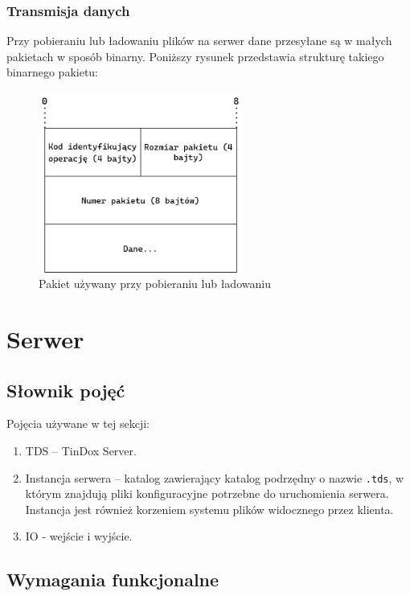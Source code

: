 \documentclass[10pt,a4paper]{article}
\begin{document}
\subsubsection{Transmisja danych}
Przy pobieraniu lub ładowaniu plików na serwer dane przesyłane są w małych pakietach w sposób binarny. Poniższy rysunek przedstawia strukturę takiego binarnego pakietu:

\begin{figure}[ht]
\centering
\includegraphics[width=0.6\textwidth]{img/packet.png}
\caption{\label{fig:packet.png}Pakiet używany przy pobieraniu lub ładowaniu}
\end{figure}
\FloatBarrier

\pagebreak
\section{Serwer}

\subsection{Słownik pojęć}
\noindent Pojęcia używane w tej sekcji:
\begin{enumerate}
    \item TDS -- TinDox Server.
    \item Instancja serwera -- katalog zawierający katalog podrzędny o nazwie \texttt{.tds}, w którym znajdują pliki konfiguracyjne potrzebne do uruchomienia serwera. Instancja jest również korzeniem systemu plików widocznego przez klienta.
    \item IO - wejście i wyjście.
\end{enumerate}

\subsection{Wymagania funkcjonalne}
\end{document}
